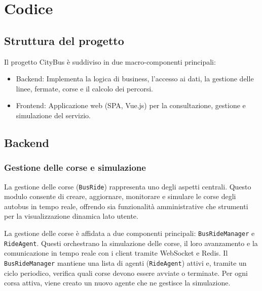 \section{Codice}

\subsection{Struttura del progetto}

Il progetto CityBus è suddiviso in due macro-componenti principali:

\begin{itemize}
    \item Backend: Implementa la logica di business, l’accesso ai dati, la gestione delle linee, fermate, corse e il calcolo dei percorsi.
    \item Frontend: Applicazione web (SPA, Vue.js) per la consultazione, gestione e simulazione del servizio.
\end{itemize}

\subsection{Backend}

\subsubsection{Gestione delle corse e simulazione}

La gestione delle corse (\texttt{BusRide}) rappresenta uno degli aspetti centrali. Questo modulo consente di creare, aggiornare, monitorare e simulare le corse degli autobus in tempo reale, offrendo sia funzionalità amministrative che strumenti per la visualizzazione dinamica lato utente.

La gestione delle corse è affidata a due componenti principali: \texttt{BusRideManager} e \texttt{RideAgent}. Questi orchestrano la simulazione delle corse, il loro avanzamento e la comunicazione in tempo reale con i client tramite WebSocket e Redis.
Il \texttt{BusRideManager} mantiene una lista di agenti (\texttt{RideAgent}) attivi e, tramite un ciclo periodico, verifica quali corse devono essere avviate o terminate. Per ogni corsa attiva, viene creato un nuovo agente che ne gestisce la simulazione.

